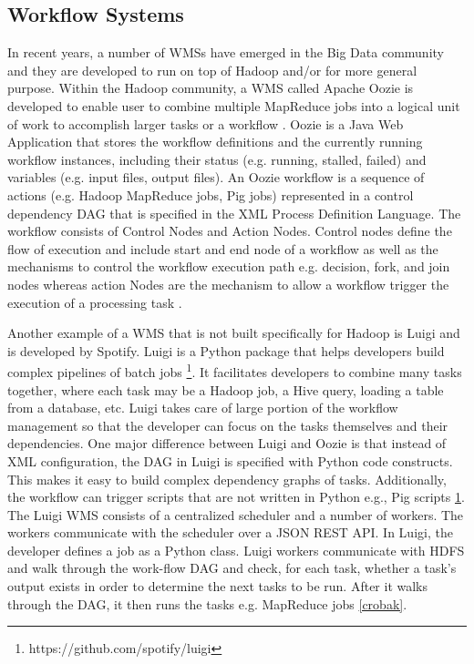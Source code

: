 \subsection{Workflow Systems}
In recent years, a number of WMSs have emerged in the Big Data community and they are developed to run on top of Hadoop and/or for more general purpose. Within the Hadoop community, a WMS called Apache Oozie is developed to enable user to combine multiple MapReduce jobs into a logical unit of work to accomplish larger tasks or a workflow \cite{islam2012oozie}. Oozie is a Java Web Application that stores the workflow definitions and the currently running workflow instances, including their status (e.g. running, stalled, failed) and variables (e.g. input files, output files). An Oozie workflow is a sequence of actions (e.g. Hadoop MapReduce jobs, Pig jobs) represented in a control dependency DAG that is specified in the XML Process Definition Language. The workflow consists of Control Nodes and Action Nodes. Control nodes define the flow of execution and include start and end node of a workflow as well as the mechanisms to control the workflow execution path e.g. decision, fork, and join nodes whereas action Nodes are the mechanism to allow a workflow trigger the execution of a processing task \cite{islam2012oozie}. 

Another example of a WMS that is not built specifically for Hadoop is Luigi and is developed by Spotify. Luigi is a Python package that helps developers build complex pipelines of batch jobs \footnote{\label{luigi}https://github.com/spotify/luigi}. It facilitates developers to combine many tasks together, where each task may be a Hadoop job, a Hive query, loading a table from a database, etc. Luigi takes care of large portion of the workflow management so that the developer can focus on the tasks themselves and their dependencies. One major difference between Luigi and Oozie is that instead of XML configuration, the DAG in Luigi is specified with Python code constructs. This makes it easy to build complex dependency graphs of tasks. Additionally, the workflow can trigger scripts that are not written in Python e.g., Pig scripts \cref{luigi}. The Luigi WMS consists of a centralized scheduler and a number of workers. The workers communicate with the scheduler over a JSON REST API. In Luigi, the developer defines a job as a Python class. Luigi workers communicate with HDFS and walk through the work-flow DAG and check, for each task, whether a task’s output exists in order to determine the next tasks to be run. After it walks through the DAG, it then runs the tasks e.g. MapReduce jobs \cref{crobak}. 